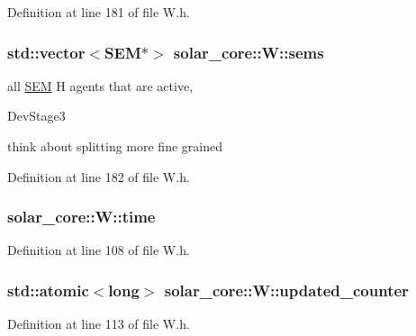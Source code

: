 Definition at line 181 of file W.\+h.

\hypertarget{classsolar__core_1_1_w_ab6349cbc751747a05618dad4ebb1b726}{}
\subsubsection[{sems}]{\setlength{\rightskip}{0pt plus 5cm}std\+::vector$<${\bf S\+E\+M}$\ast$$>$ solar\+\_\+core\+::\+W\+::sems\hspace{0.3cm}{\ttfamily [protected]}}\label{classsolar__core_1_1_w_ab6349cbc751747a05618dad4ebb1b726}
all \hyperlink{classsolar__core_1_1_s_e_m}{S\+E\+M} H agents that are active,\begin{DoxyRefDesc}{Dev\+Stage3}
\item[\hyperlink{_dev_stage3__DevStage3000006}{Dev\+Stage3}]think about splitting more fine grained \end{DoxyRefDesc}


Definition at line 182 of file W.\+h.

\hypertarget{classsolar__core_1_1_w_ae96b30122adc9fae8fc2f209a4c89b0a}{}
\subsubsection[{time}]{ solar\+\_\+core\+::\+W\+::time}\label{classsolar__core_1_1_w_ae96b30122adc9fae8fc2f209a4c89b0a}


Definition at line 108 of file W.\+h.

\hypertarget{classsolar__core_1_1_w_a775d817c6117b462571c3fca62fe0c86}{}
\subsubsection[{updated\+\_\+counter}]{\setlength{\rightskip}{0pt plus 5cm}std\+::atomic$<$long$>$ solar\+\_\+core\+::\+W\+::updated\+\_\+counter}\label{classsolar__core_1_1_w_a775d817c6117b462571c3fca62fe0c86}


Definition at line 113 of file W.\+h.


